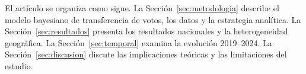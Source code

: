 El artículo se organiza como sigue. La Sección~\ref{sec:metodologia} describe el modelo bayesiano de transferencia de votos, los datos y la estrategia analítica. La Sección~\ref{sec:resultados} presenta los resultados nacionales y la heterogeneidad geográfica. La Sección~\ref{sec:temporal} examina la evolución 2019--2024. La Sección~\ref{sec:discusion} discute las implicaciones teóricas y las limitaciones del estudio.
